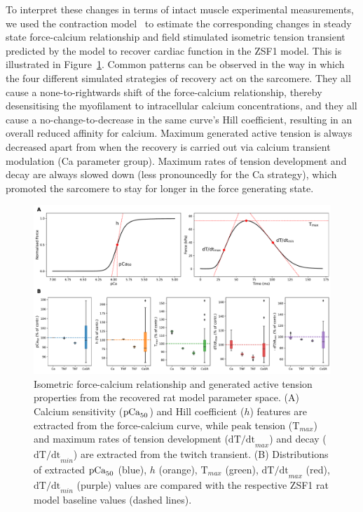 \vspace{0.2cm}
To interpret these changes in terms of intact muscle experimental measurements, we used the contraction model~\cite{Land:2012*a} to estimate the corresponding changes in steady state force-calcium relationship and field stimulated isometric tension transient predicted by the model to recover cardiac function in the ZSF1 model. This is illustrated in Figure~\ref{fig:fpcatension}. Common patterns can be observed in the way in which the four different simulated strategies of recovery act on the sarcomere. They all cause a none-to-rightwards shift of the force-calcium relationship, thereby desensitising the myofilament to intracellular calcium concentrations, and they all cause a no-change-to-decrease in the same curve's Hill coefficient, resulting in an overall reduced affinity for calcium. Maximum generated active tension is always decreased apart from when the recovery is carried out via calcium transient modulation (Ca parameter group). Maximum rates of tension development and decay are always slowed down (less pronouncedly for the Ca strategy), which promoted the sarcomere to stay for longer in the force generating state.

\begin{figure}[!ht]
    \myfloatalign
    \includegraphics[width=\textwidth]{figures/chapter07/FpCa_T_trends_explained.pdf}
    \caption{Isometric force-calcium relationship and generated active tension properties from the recovered rat model parameter space. (A) Calcium sensitivity ($\textrm{pCa}_{50}$) and Hill coefficient ($h$) features are extracted from the force-calcium curve, while peak tension ($\textrm{T}_{max}$) and maximum rates of tension development ($\textrm{dT/dt}_{max}$) and decay ($\textrm{dT/dt}_{min}$) are extracted from the twitch transient. (B) Distributions of extracted $\textrm{pCa}_{50}$ (blue), $h$ (orange), $\textrm{T}_{max}$ (green), $\textrm{dT/dt}_{max}$ (red), $\textrm{dT/dt}_{min}$ (purple) values are compared with the respective ZSF1 rat model baseline values (dashed lines).}
    \label{fig:fpcatension}
\end{figure}


